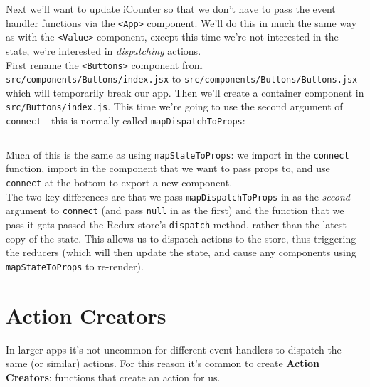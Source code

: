 Next we'll want to update iCounter so that we don't have to pass the event handler functions via the \texttt{<App>} component. We'll do this in much the same way as with the \texttt{<Value>} component, except this time we're not interested in the state, we're interested in \textit{dispatching} actions.
\\

First rename the \texttt{<Buttons>} component from  \texttt{src/components/Buttons/index.jsx} to \texttt{src/components/Buttons/Buttons.jsx} - which will temporarily break our app. Then we'll create a container component in \texttt{src/Buttons/index.js}. This time we're going to use the second argument of \texttt{connect} - this is normally called \texttt{mapDispatchToProps}:

\inputminted{js}{03/figures/01-mapDispatchToProps.js}

Much of this is the same as using \texttt{mapStateToProps}: we import in the \texttt{connect} function, import in the component that we want to pass props to, and use \texttt{connect} at the bottom to export a new component.
\\

The two key differences are that we pass \texttt{mapDispatchToProps} in as the \textit{second} argument to \texttt{connect} (and pass \texttt{null} in as the first) and the function that we pass it gets passed the Redux store's \texttt{dispatch} method, rather than the latest copy of the state. This allows us to dispatch actions to the store, thus triggering the reducers (which will then update the state, and cause any components using \texttt{mapStateToProps} to re-render).


\par\bigskip



\section{Action Creators}

In larger apps it's not uncommon for different event handlers to dispatch the same (or similar) actions. For this reason it's common to create \textbf{Action Creators}: functions that create an action for us.
\\

